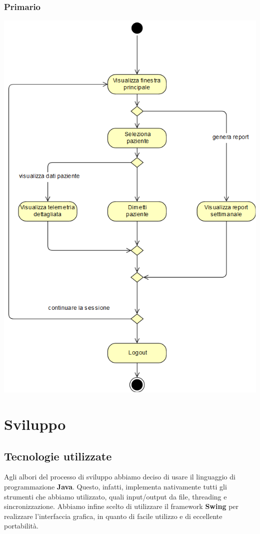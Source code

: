 \documentclass[a4paper]{report}
\begin{document}
        \subsection*{Primario}
        \begin{center}
                    \includegraphics[scale=0.5]{activity/PrimarioActivity.png}
        \end{center}
            
            
\chapter{Sviluppo}
    \section{Tecnologie utilizzate}
        Agli albori del processo di sviluppo abbiamo deciso di usare il linguaggio di programmazione \textbf{Java}. Questo, infatti, implementa nativamente tutti gli strumenti che abbiamo utilizzato, quali input/output da file, threading e sincronizzazione.
        Abbiamo infine scelto di utilizzare il framework \textbf{Swing} per realizzare l'interfaccia grafica, in quanto di facile utilizzo e di eccellente portabilit\`a.\\
        
\end{document}
